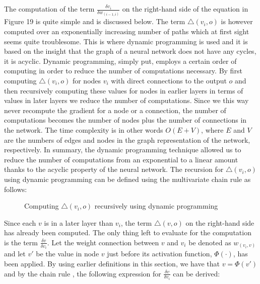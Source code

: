 \documentclass[titlepage]{article}
\begin{document}
\noindent
The computation of the term $\frac{\delta v_{i}}{\delta w_{(i-1, i)}}$ on the right-hand side of the equation in Figure 19 is quite simple and is discussed below. The term $\triangle (v_{i}, o)$ is however computed over an exponentially increasing number of paths which at first sight seems quite troublesome. This is where dynamic programming is used and it is based on the insight that the graph of a neural network does not have any cycles, it is acyclic. Dynamic programming, simply put, employs a certain order of computing in order to reduce the number of computations necessary. By first computing $\triangle (v_{i}, o)$ for nodes $v_{i}$ with direct connections to the output $o$ and then recursively computing these values for nodes in earlier layers in terms of values in later layers we reduce the number of computations. Since we this way never recompute the gradient for a node or a connection, the number of computations becomes the number of nodes plus the number of connections in the network. The time complexity is in other words $O(E + V)$, where $E$ and $V$ are the numbers of edges and nodes in the graph representation of the network, respectively. In summary, the dynamic programming technique allowed us to reduce the number of computations from an exponential to a linear amount thanks to the acyclic property of the neural network. The recursion for $\triangle (v_{i}, o)$ using dynamic programming can be defined using the multivariate chain rule as follows:

\vskip 0.3cm

\begin{figure}[h]
    \centerline{
    }
    \vskip 0.3cm
    \caption{Computing $\triangle (v_{i}, o)$ recursively using dynamic programming}
\end{figure}

\vskip 0.2cm

\noindent
Since each $v$ is in a later layer than $v_{i}$, the term $\triangle (v, o)$ on the right-hand side has already been computed. The only thing left to evaluate for the computation is the term $\frac{\delta v}{\delta v_{i}}$. Let the weight connection between $v$ and $v_{i}$ be denoted as $w_{(v_{i}, v)}$ and let $v'$ be the value in node $v$ just before its activation function, $\Phi(\cdot)$, has been applied. By using earlier definitions in this section, we have that $v = \Phi(v')$ and by the chain rule \cite{charu}, the following expression for $\frac{\delta v}{\delta v_{i}}$ can be derived:
\end{document}
